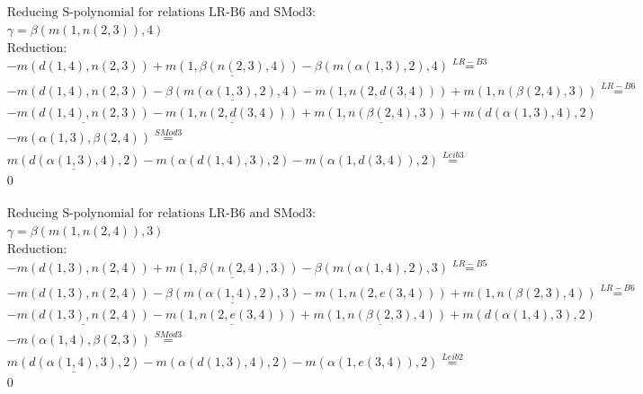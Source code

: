 \documentclass[11pt]{amsart}
\begin{document}
\begin{align*} 
& \text{Reducing S-polynomial for relations LR-B6 and SMod3:} \\ 
& \gamma = \beta(m(1,n(2,3)),4) \\ 
& \text{Reduction}: \\& - m(d(1,4),n(2,3)) + \underline{m(1,\beta(n(2,3),4))} - \beta(m(\alpha(1,3),2),4) \stackrel{ LR-B3 }{=}  \\ 
& - m(d(1,4),n(2,3)) - \underline{\beta(m(\alpha(1,3),2),4)} - m(1,n(2,d(3,4))) + m(1,n(\beta(2,4),3)) \stackrel{ LR-B6 }{=}  \\ 
& - \underline{m(d(1,4),n(2,3))} - \underline{m(1,n(2,d(3,4)))} + \underline{m(1,n(\beta(2,4),3))} + m(d(\alpha(1,3),4),2)\\ 
 &  - m(\alpha(1,3),\beta(2,4)) \stackrel{ SMod3 }{=}  \\ 
&\underline{m(d(\alpha(1,3),4),2)} - m(\alpha(d(1,4),3),2) - m(\alpha(1,d(3,4)),2) \stackrel{ Leib3 }{=}  \\ 
&0\\ 
\end{align*} 
 
\begin{align*} 
& \text{Reducing S-polynomial for relations LR-B6 and SMod3:} \\ 
& \gamma = \beta(m(1,n(2,4)),3) \\ 
& \text{Reduction}: \\& - m(d(1,3),n(2,4)) + \underline{m(1,\beta(n(2,4),3))} - \beta(m(\alpha(1,4),2),3) \stackrel{ LR-B5 }{=}  \\ 
& - m(d(1,3),n(2,4)) - \underline{\beta(m(\alpha(1,4),2),3)} - m(1,n(2,e(3,4))) + m(1,n(\beta(2,3),4)) \stackrel{ LR-B6 }{=}  \\ 
& - \underline{m(d(1,3),n(2,4))} - \underline{m(1,n(2,e(3,4)))} + \underline{m(1,n(\beta(2,3),4))} + m(d(\alpha(1,4),3),2)\\ 
 &  - m(\alpha(1,4),\beta(2,3)) \stackrel{ SMod3 }{=}  \\ 
&\underline{m(d(\alpha(1,4),3),2)} - m(\alpha(d(1,3),4),2) - m(\alpha(1,e(3,4)),2) \stackrel{ Leib2 }{=}  \\ 
&0\\ 
\end{align*} 
 
\end{document}
